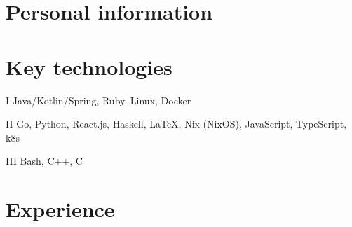 \documentclass{cv}
\begin{document}
\iftrue
{}

\section{Personal information}




\fi


\section{Key technologies}

\begin{cvblock}{I}
  Java/Kotlin/Spring, Ruby, Linux, Docker
\end{cvblock}

\begin{cvblock}{II}
  Go, Python, React.js, Haskell, \LaTeX, Nix (NixOS), JavaScript, TypeScript, k8s
\end{cvblock}

\begin{cvblock}{III}
  Bash, C++, C
\end{cvblock}


\section{Experience}
\end{document}
